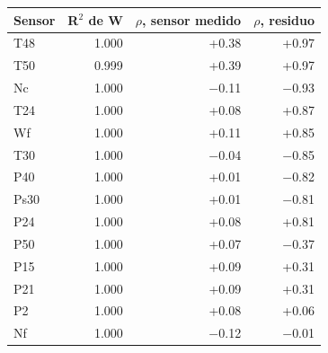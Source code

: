 \begin{tabular}{lrrr}
\toprule
\textbf{Sensor} & \textbf{R$^{2}$ de W} & \textbf{$\rho$, sensor medido} & \textbf{$\rho$, residuo} \\
\midrule
T48 & 1.000 & +0.38 & +0.97 \\
T50 & 0.999 & +0.39 & +0.97 \\
Nc & 1.000 & $-$0.11 & $-$0.93 \\
T24 & 1.000 & +0.08 & +0.87 \\
Wf & 1.000 & +0.11 & +0.85 \\
T30 & 1.000 & $-$0.04 & $-$0.85 \\
P40 & 1.000 & +0.01 & $-$0.82 \\
Ps30 & 1.000 & +0.01 & $-$0.81 \\
P24 & 1.000 & +0.08 & +0.81 \\
P50 & 1.000 & +0.07 & $-$0.37 \\
P15 & 1.000 & +0.09 & +0.31 \\
P21 & 1.000 & +0.09 & +0.31 \\
P2 & 1.000 & +0.08 & +0.06 \\
Nf & 1.000 & $-$0.12 & $-$0.01 \\
\bottomrule
\end{tabular}

